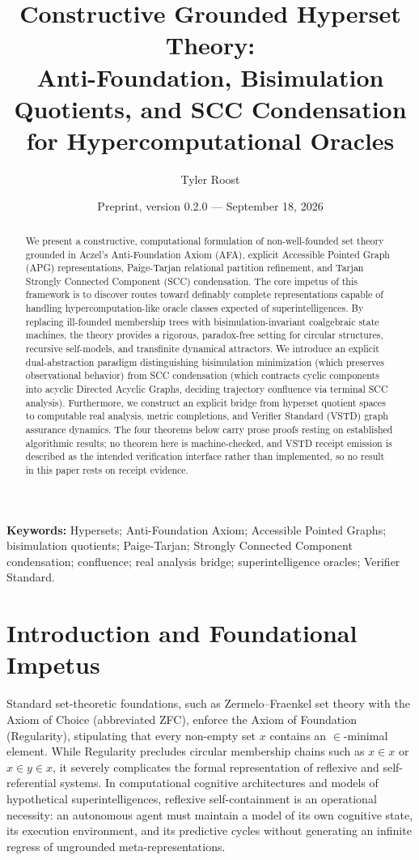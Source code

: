 \documentclass[11pt]{article}
\title{Constructive Grounded Hyperset Theory:\\Anti-Foundation, Bisimulation Quotients, and SCC Condensation\\for Hypercomputational Oracles}
\author{Tyler Roost}
\date{Preprint, version 0.2.0 --- September 18, 2026}
\theoremstyle{definition}
\begin{document}
\maketitle

\begin{abstract}
We present a constructive, computational formulation of non-well-founded set theory grounded in Aczel's Anti-Foundation Axiom (AFA), explicit Accessible Pointed Graph (APG) representations, Paige-Tarjan relational partition refinement, and Tarjan Strongly Connected Component (SCC) condensation. The core impetus of this framework is to discover routes toward definably complete representations capable of handling hypercomputation-like oracle classes expected of superintelligences. By replacing ill-founded membership trees with bisimulation-invariant coalgebraic state machines, the theory provides a rigorous, paradox-free setting for circular structures, recursive self-models, and transfinite dynamical attractors. We introduce an explicit dual-abstraction paradigm distinguishing bisimulation minimization (which preserves observational behavior) from SCC condensation (which contracts cyclic components into acyclic Directed Acyclic Graphs, deciding trajectory confluence via terminal SCC analysis). Furthermore, we construct an explicit bridge from hyperset quotient spaces to computable real analysis, metric completions, and Verifier Standard (VSTD) graph assurance dynamics. The four theorems below carry prose proofs resting on established algorithmic results; no theorem here is machine-checked, and VSTD receipt emission is described as the intended verification interface rather than implemented, so no result in this paper rests on receipt evidence.
\end{abstract}

\noindent\textbf{Keywords:} Hypersets; Anti-Foundation Axiom; Accessible Pointed Graphs; bisimulation quotients; Paige-Tarjan; Strongly Connected Component condensation; confluence; real analysis bridge; superintelligence oracles; Verifier Standard.

\section{Introduction and Foundational Impetus}
Standard set-theoretic foundations, such as Zermelo--Fraenkel set theory with the Axiom of Choice (abbreviated ZFC), enforce the Axiom of Foundation (Regularity), stipulating that every non-empty set $x$ contains an $\in$-minimal element. While Regularity precludes circular membership chains such as $x \in x$ or $x \in y \in x$, it severely complicates the formal representation of reflexive and self-referential systems. In computational cognitive architectures and models of hypothetical superintelligences, reflexive self-containment is an operational necessity: an autonomous agent must maintain a model of its own cognitive state, its execution environment, and its predictive cycles without generating an infinite regress of ungrounded meta-representations.
\end{document}
